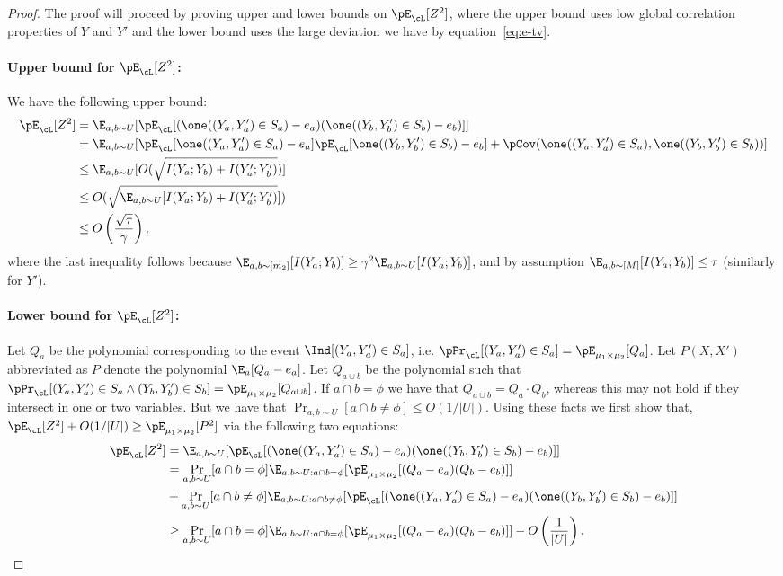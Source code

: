\begin{proof}
The proof will proceed by proving upper and lower bounds on $\pE_{\cL}[Z^2]$, where the upper bound uses low global correlation properties of $Y$ and $Y'$ and the lower bound uses the large deviation we have by equation~\ref{eq:e-tv}. 
\paragraph{Upper bound for $\pE_{\cL}[Z^2]$:}
We have the following upper bound:
\begin{align*}
\pE_{\cL}[Z^2] &= \E_{a,b \sim U}[\pE_{\cL}[(\one((Y_a,Y'_a) \in S_a) - e_a)(\one((Y_b,Y'_b) \in S_b) - e_b)]] \\
&= \E_{a,b \sim U}[\pE_{\cL}[\one((Y_a,Y'_a) \in S_a) - e_a]\pE_{\cL}[\one((Y_b,Y'_b) \in S_b) - e_b] + \pCov(\one((Y_a,Y'_a) \in S_a),\one((Y_b,Y'_b) \in S_b))] \\
&\leq \E_{a,b \sim U}[O(\sqrt{I(Y_a;Y_b) + I(Y'_a;Y'_b)})] \\
&\leq O(\sqrt{\E_{a,b \sim U}[I(Y_a;Y_b) + I(Y'_a;Y'_b)}])\\
&\leq O\left(\frac{\sqrt{\tau}}{\gamma}\right),
\end{align*}
where the last inequality follows because $\E_{a,b \sim [m_2]}[I(Y_a;Y_b)] \geq \gamma^2 \E_{a,b \sim U}[I(Y_a;Y_b)]$, and by assumption $\E_{a,b \sim [M]}[I(Y_a;Y_b)] \leq \tau$ (similarly for $Y'$).

\paragraph{Lower bound for $\pE_{\cL}[Z^2]$:}
Let $Q_a$ be the polynomial corresponding to the event $\Ind[(Y_a,Y'_a) \in S_a]$, i.e. $\pPr_{\cL}[(Y_a,Y'_a) \in S_a] = \pE_{\mu_1 \times \mu_2}[Q_a]$. Let $P(X,X')$ abbreviated as $P$ denote the polynomial $\E_a[Q_a - e_a]$. Let $Q_{a \cup b}$ be the polynomial such that $\pPr_{\cL}[(Y_a,Y'_a) \in S_a \wedge (Y_b,Y'_b) \in S_b] = \pE_{\mu_1 \times \mu_2}[Q_{a \cup b}]$. If $a \cap b = \phi$ we have that $Q_{a \cup b} = Q_a \cdot Q_b$, whereas this may not hold if they intersect in one or two variables. But we have that $\Pr_{a, b \sim U}[a \cap b \neq \phi] \leq O(1/|U|)$.
Using these facts we first show that, $\pE_{\cL}[Z^2]+O(1/|U|) \geq \pE_{\mu_1 \times \mu_2}[P^2]$ via the following two equations:
\begin{align}
\pE_{\cL}[Z^2] &= \E_{a,b \sim U}[\pE_{\cL}[(\one((Y_a,Y'_a) \in S_a) - e_a)(\one((Y_b,Y'_b) \in S_b) - e_b)]] \notag \\
&=\Pr_{a,b \sim U}[a \cap b = \phi]\E_{a,b \sim U: a\cap b=\phi}[\pE_{\mu_1 \times \mu_2}[(Q_{a} - e_a)(Q_b - e_b)]] \notag\\ &+ \Pr_{a,b \sim U}[a \cap b \neq \phi]\E_{a,b \sim U: a\cap b\neq \phi}[\pE_{\cL}[(\one((Y_a,Y'_a) \in S_a) - e_a)(\one((Y_b,Y'_b) \in S_b) - e_b)]] \notag \\
&\geq \Pr_{a,b \sim U}[a \cap b = \phi]\E_{a,b \sim U: a\cap b=\phi}[\pE_{\mu_1 \times \mu_2}[(Q_{a} - e_a)(Q_b - e_b)]] - O\left(\frac{1}{|U|}\right).\label{eq:z2-1}
\end{align}


\end{proof}
